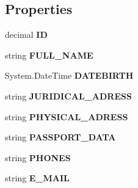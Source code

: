 \subsection*{Properties}
\begin{CompactItemize}
\item 
decimal \textbf{ID}\hspace{0.3cm}{\tt  [get, set]}\label{class_automatic_medical_system_1_1_data_set1_1_1_d_o_c_t_o_r_s_row_e8e42cfb2fe700675f526cb43202e502}

\item 
string \textbf{FULL\_\-NAME}\hspace{0.3cm}{\tt  [get, set]}\label{class_automatic_medical_system_1_1_data_set1_1_1_d_o_c_t_o_r_s_row_1349099f6342b2255b72084a078797bf}

\item 
System.DateTime \textbf{DATEBIRTH}\hspace{0.3cm}{\tt  [get, set]}\label{class_automatic_medical_system_1_1_data_set1_1_1_d_o_c_t_o_r_s_row_7d6a2e9a07382990c0de83e4ce1fa7dc}

\item 
string \textbf{JURIDICAL\_\-ADRESS}\hspace{0.3cm}{\tt  [get, set]}\label{class_automatic_medical_system_1_1_data_set1_1_1_d_o_c_t_o_r_s_row_b84babcad60095dda353fe5ddcdc79ba}

\item 
string \textbf{PHYSICAL\_\-ADRESS}\hspace{0.3cm}{\tt  [get, set]}\label{class_automatic_medical_system_1_1_data_set1_1_1_d_o_c_t_o_r_s_row_67633f4b1dd5023fe8ef3729d02278b5}

\item 
string \textbf{PASSPORT\_\-DATA}\hspace{0.3cm}{\tt  [get, set]}\label{class_automatic_medical_system_1_1_data_set1_1_1_d_o_c_t_o_r_s_row_843fb005afc320580bff5ed1c4fbaa11}

\item 
string \textbf{PHONES}\hspace{0.3cm}{\tt  [get, set]}\label{class_automatic_medical_system_1_1_data_set1_1_1_d_o_c_t_o_r_s_row_05d9d7eb280e3923cfa92ae325aaf21b}

\item 
string \textbf{E\_\-MAIL}\hspace{0.3cm}{\tt  [get, set]}\label{class_automatic_medical_system_1_1_data_set1_1_1_d_o_c_t_o_r_s_row_64ef66889a6db2e131eea2596a39e9e4}


\end{CompactItemize}
